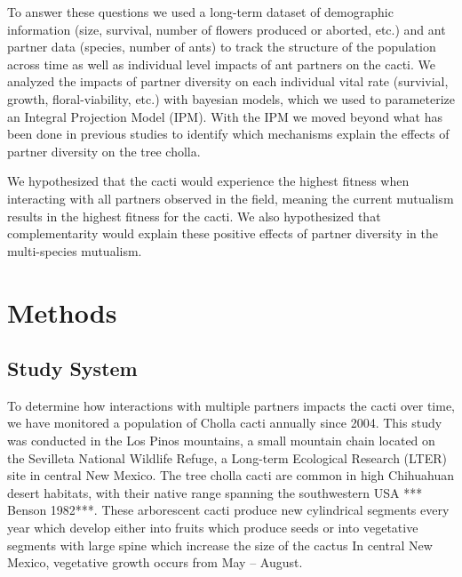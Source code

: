 \documentclass[12pt,a4paper]{article}
\begin{document}
To answer these questions we used a long-term dataset of demographic information (size, survival, number of flowers produced or aborted, etc.) and ant partner data (species, number of ants) to track the structure of the population across time as well as individual level impacts of ant partners on the cacti. 
We analyzed the impacts of partner diversity on each individual vital rate (survivial, growth, floral-viability, etc.) with bayesian models, which we used to parameterize an Integral Projection Model (IPM).
With the IPM we moved beyond what has been done in previous studies\cite{Palmer2010} to identify which mechanisms explain the effects of partner diversity on the tree cholla. 


We hypothesized that the cacti would experience the highest fitness when interacting with all partners observed in the field, meaning the current mutualism results in the highest fitness for the cacti.
We also hypothesized that complementarity would explain these positive effects of partner diversity in the multi-species mutualism.
\section*{Methods}
\subsection*{Study System}

To determine how interactions with multiple partners impacts the cacti over time, we have monitored a population of Cholla cacti annually since 2004. 
This study was conducted in the Los Pinos mountains, a small mountain chain located on the Sevilleta National Wildlife Refuge, a Long-term Ecological Research (LTER) site in central New Mexico. 
The tree cholla cacti are common in high Chihuahuan desert habitats, with their native range spanning the southwestern USA *** Benson 1982***. 
These arborescent cacti produce new cylindrical segments every year which develop either into fruits which produce seeds or into vegetative segments with large spine which increase the size of the cactus %
In central New Mexico, vegetative growth occurs from May -- August.
\end{document}
